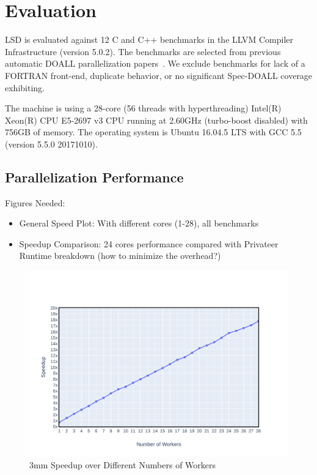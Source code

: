 \section{Evaluation}

LSD is evaluated against 12 C and C++ benchmarks in the LLVM Compiler
Infrastructure (version 5.0.2). The benchmarks are selected from previous
automatic DOALL parallelization papers~\cite{johnson:12:pldi,kim:12:cgo}. We
exclude benchmarks for lack of a FORTRAN front-end, duplicate behavior, or no
significant Spec-DOALL coverage exhibiting.

The machine is using a 28-core (56 threads with hyperthreading) Intel(R) Xeon(R)
CPU E5-2697 v3 CPU running at 2.60GHz (turbo-boost disabled) with 756GB of
memory. The operating system is Ubuntu 16.04.5 LTS with GCC 5.5 (version 5.5.0
20171010).


\subsection{Parallelization Performance}
Figures Needed:
\begin{itemize}
\item General Speed Plot: With different cores (1-28), all benchmarks
\item Speedup Comparison: 24 cores performance compared with Privateer
Runtime breakdown (how to minimize the overhead?)

\end{itemize}

\begin{figure}[htp]
  \includegraphics[width=\textwidth]{figures/3mm-scale-crop}
  \caption{3mm Speedup over Different Numbers of Workers}
  \label{fig:3mm-scale}
\end{figure}


